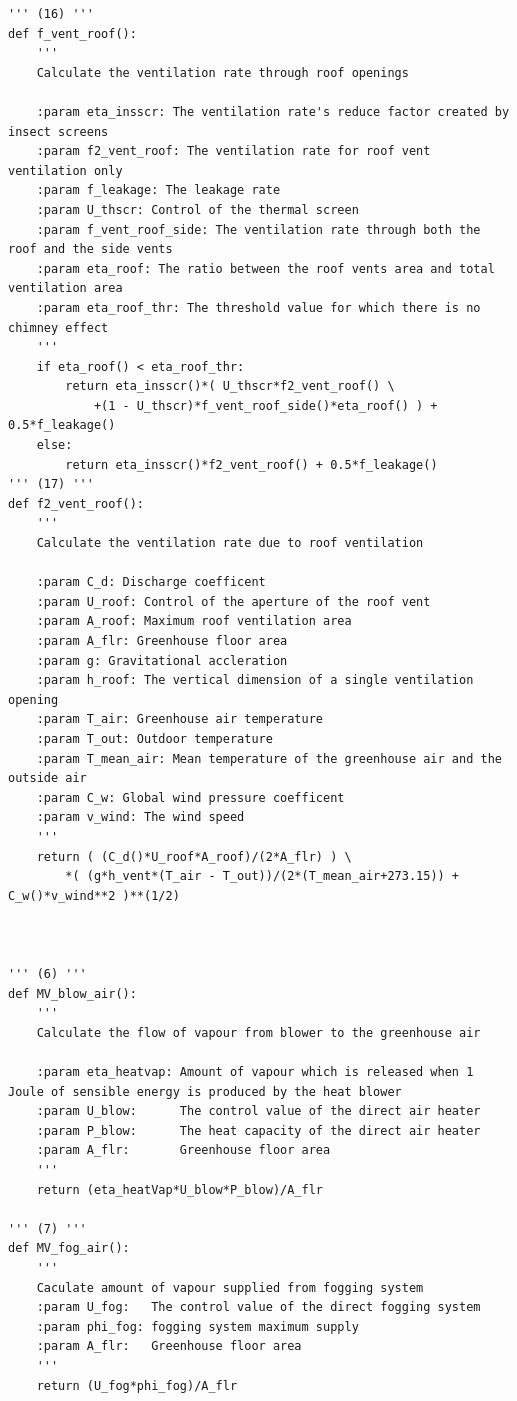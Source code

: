 \documentclass[a4paper]{article}
\begin{document}
\begin{appendices}
\begin{verbatim}
''' (16) '''
def f_vent_roof():
    '''
    Calculate the ventilation rate through roof openings 

    :param eta_insscr: The ventilation rate's reduce factor created by insect screens
    :param f2_vent_roof: The ventilation rate for roof vent ventilation only
    :param f_leakage: The leakage rate
    :param U_thscr: Control of the thermal screen
    :param f_vent_roof_side: The ventilation rate through both the roof and the side vents
    :param eta_roof: The ratio between the roof vents area and total ventilation area
    :param eta_roof_thr: The threshold value for which there is no chimney effect
    '''
    if eta_roof() < eta_roof_thr:
        return eta_insscr()*( U_thscr*f2_vent_roof() \
            +(1 - U_thscr)*f_vent_roof_side()*eta_roof() ) + 0.5*f_leakage()
    else:
        return eta_insscr()*f2_vent_roof() + 0.5*f_leakage()
''' (17) '''
def f2_vent_roof():
    '''
    Calculate the ventilation rate due to roof ventilation

    :param C_d: Discharge coefficent
    :param U_roof: Control of the aperture of the roof vent
    :param A_roof: Maximum roof ventilation area
    :param A_flr: Greenhouse floor area
    :param g: Gravitational accleration
    :param h_roof: The vertical dimension of a single ventilation opening
    :param T_air: Greenhouse air temperature
    :param T_out: Outdoor temperature
    :param T_mean_air: Mean temperature of the greenhouse air and the outside air 
    :param C_w: Global wind pressure coefficent
    :param v_wind: The wind speed
    '''
    return ( (C_d()*U_roof*A_roof)/(2*A_flr) ) \
        *( (g*h_vent*(T_air - T_out))/(2*(T_mean_air+273.15)) + C_w()*v_wind**2 )**(1/2)



''' (6) '''
def MV_blow_air():
    '''
    Calculate the flow of vapour from blower to the greenhouse air

    :param eta_heatvap: Amount of vapour which is released when 1 Joule of sensible energy is produced by the heat blower 
    :param U_blow: 		The control value of the direct air heater
    :param P_blow: 		The heat capacity of the direct air heater
    :param A_flr: 		Greenhouse floor area
    '''
    return (eta_heatVap*U_blow*P_blow)/A_flr

''' (7) '''
def MV_fog_air():
	'''
	Caculate amount of vapour supplied from fogging system
    :param U_fog: 	The control value of the direct fogging system
    :param phi_fog: fogging system maximum supply
    :param A_flr: 	Greenhouse floor area
	'''
	return (U_fog*phi_fog)/A_flr


\end{verbatim}
\end{appendices}
\end{document}
